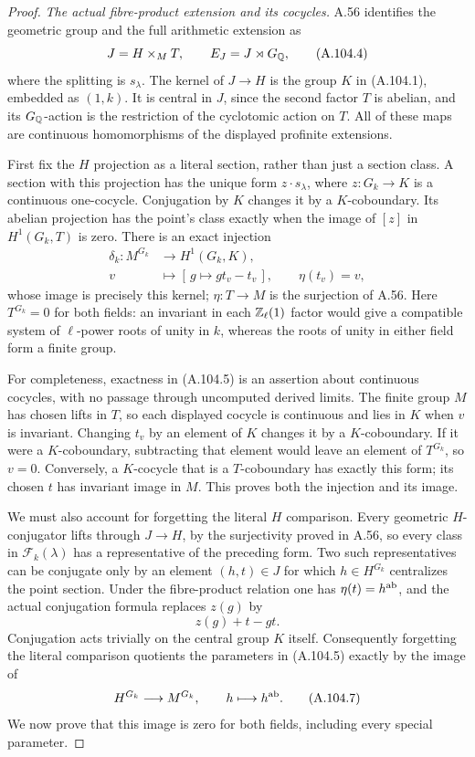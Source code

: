 \begin{proof}
\emph{The actual fibre-product extension and its cocycles.}
A.56 identifies the geometric group and the full
arithmetic extension as
\[
          J=H\mathbin{\times}_M T,
                     \qquad E_J=J\rtimes G_\mathbb Q,
\tag{A.104.4}
\]
where the splitting is $s_\lambda$.
The kernel of $J\to H$ is the group $K$ in
(A.104.1), embedded as $(1,k)$.
It is central in $J$, since the second factor
$T$ is abelian, and its $G_\mathbb Q$-action is the
restriction of the cyclotomic action on $T$.
All of these maps are continuous homomorphisms
of the displayed profinite extensions.

First fix the $H$ projection as a literal
section, rather than just a section class.
A section with this projection has the unique
form $z\cdot s_\lambda$, where
$z:G_k\to K$ is a continuous one-cocycle.
Conjugation by $K$ changes it by a $K$-coboundary.
Its abelian projection has the point's class
exactly when the image of $[z]$ in
$H^1(G_k,T)$ is zero.
There is an exact injection
\[
 \begin{split}
 \delta_k:M^{G_k}&\longrightarrow H^1(G_k,K),\\
 v&\longmapsto[\,g\longmapsto g t_v-t_v\,],
                  \qquad \eta(t_v)=v,
 \end{split}
\tag{A.104.5}
\]
whose image is precisely this kernel;
$\eta:T\to M$ is the surjection of A.56.
Here $T^{G_k}=0$ for both fields: an invariant
in each $\mathbb Z_\ell(1)$ factor would give a
compatible system of $\ell$-power roots of
unity in $k$, whereas the roots of unity in
either field form a finite group.

For completeness, exactness in (A.104.5) is
an assertion about continuous cocycles, with
no passage through uncomputed derived limits.
The finite group $M$ has chosen lifts in $T$,
so each displayed cocycle is continuous and
lies in $K$ when $v$ is invariant.
Changing $t_v$ by an element of $K$ changes
it by a $K$-coboundary.
If it were a $K$-coboundary, subtracting that
element would leave an element of $T^{G_k}$,
so $v=0$.  Conversely, a $K$-cocycle that
is a $T$-coboundary has exactly this form;
its chosen $t$ has invariant image in $M$.
This proves both the injection and its image.

We must also account for forgetting the literal
$H$ comparison.  Every geometric $H$-conjugator
lifts through $J\to H$, by the surjectivity
proved in A.56, so every class in
$\mathcal F_k(\lambda)$ has a representative
of the preceding form.
Two such representatives can be conjugate
only by an element $(h,t)\in J$ for which
$h\in H^{G_k}$ centralizes the point section.
Under the fibre-product relation one has
$\eta(t)=h^{\rm ab}$, and the actual
conjugation formula replaces $z(g)$ by
\[
                        z(g)+t-g t.
\tag{A.104.6}
\]
Conjugation acts trivially on the central
group $K$ itself.
Consequently forgetting the literal comparison
quotients the parameters in (A.104.5) exactly
by the image of
\[
                   H^{G_k}\longrightarrow M^{G_k},
                                  \qquad h\longmapsto h^{\rm ab}.
\tag{A.104.7}
\]
We now prove that this image is zero for both
fields, including every special parameter.


\end{proof}
